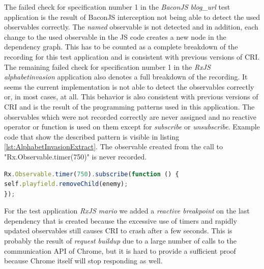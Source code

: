 The failed check for specification number 1 in the \emph{BaconJS blog\_url} test application is the result of BaconJS interception not being able to detect the used observables correctly. The \emph{named} observable is not detected and in addition, each change to the used observable in the JS code creates a new node in the dependency graph. This has to be counted as a complete breakdown of the recording for this test application and is consistent with previous versions of CRI. The remaining failed check for specification number 1 in the \emph{RxJS alphabetinvasion} application also denotes a full breakdown of the recording. It seems the current implementation is not able to detect the observables correctly or, in most cases, at all. This behavior is also consistent with previous versions of CRI and is the result of the programming patterns used in this application. The observables which were not recorded correctly are never assigned and no reactive operator or function is used on them except for \emph{subscribe} or \emph{unsubscribe}. Example code that show the described pattern is visible in listing \ref{lst:AlphabetInvasionExtract}. The observable created from the call to "Rx.Observable.timer(750)" is never recorded.

\begin{lstlisting}[language=JavaScript, caption={Extract of RxJS AlphabetInvasion test application.},label={lst:AlphabetInvasionExtract}]
Rx.Observable.timer(750).subscribe(function () {
self.playfield.removeChild(enemy);
});	
\end{lstlisting}

For the test application \emph{RxJS mario} we added a \emph{reactive breakpoint} on the last dependency that is created because the excessive use of timers and rapidly updated observables still causes CRI to crash after a few seconds. This is probably the result of \emph{request buildup} due to a large number of calls to the communication API of Chrome, but it is hard to provide a sufficient proof because Chrome itself will stop responding as well.

